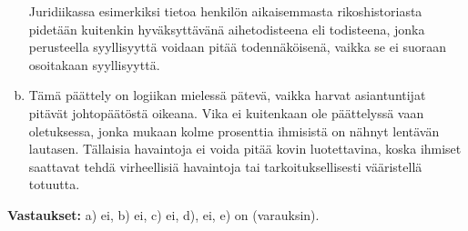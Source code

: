 \begin{esimerkki}
\begin{enumerate}[a)]
                Juridiikassa esimerkiksi tietoa henkilön aikaisemmasta rikoshistoriasta pidetään kuitenkin
                hyväksyttävänä aihetodisteena eli todisteena, jonka perusteella syyllisyyttä voidaan pitää
                todennäköisenä, vaikka se ei suoraan osoitakaan syyllisyyttä.
            \item Tämä päättely on logiikan mielessä pätevä, vaikka harvat asiantuntijat pitävät johtopäätöstä oikeana.
                Vika ei kuitenkaan ole päättelyssä vaan oletuksessa, jonka mukaan kolme prosenttia ihmisistä on nähnyt 
                lentävän lautasen.
                Tällaisia havaintoja ei voida pitää kovin luotettavina, koska ihmiset saattavat tehdä virheellisiä 
                havaintoja tai tarkoituksellisesti vääristellä totuutta.
        \end{enumerate}
    \textbf{Vastaukset:}
        a) ei, b) ei, c) ei, d), ei, e) on (varauksin).
\end{esimerkki}

